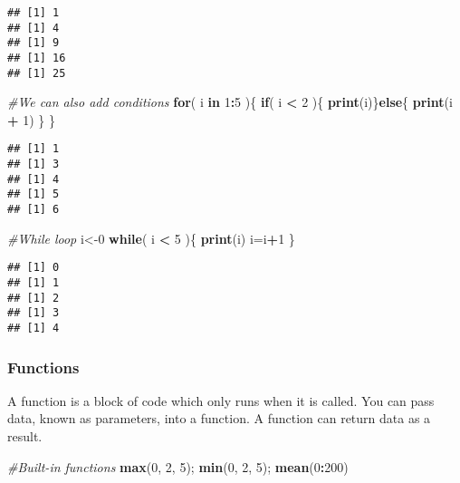 \documentclass[
]{article}
\newenvironment{Shaded}{\begin{snugshade}}{\end{snugshade}}
\newcommand{\CommentTok}[1]{\textcolor[rgb]{0.56,0.35,0.01}{\textit{#1}}}
\newcommand{\ControlFlowTok}[1]{\textcolor[rgb]{0.13,0.29,0.53}{\textbf{#1}}}
\newcommand{\DecValTok}[1]{\textcolor[rgb]{0.00,0.00,0.81}{#1}}
\newcommand{\FunctionTok}[1]{\textcolor[rgb]{0.13,0.29,0.53}{\textbf{#1}}}
\newcommand{\NormalTok}[1]{#1}
\newcommand{\OtherTok}[1]{\textcolor[rgb]{0.56,0.35,0.01}{#1}}
\newcommand{\SpecialCharTok}[1]{\textcolor[rgb]{0.81,0.36,0.00}{\textbf{#1}}}
\begin{document}
\begin{verbatim}
## [1] 1
## [1] 4
## [1] 9
## [1] 16
## [1] 25
\end{verbatim}

\begin{Shaded}
\begin{Highlighting}[]
\CommentTok{\#We can also add conditions}
\ControlFlowTok{for}\NormalTok{( i }\ControlFlowTok{in} \DecValTok{1}\SpecialCharTok{:}\DecValTok{5}\NormalTok{ )\{}
  \ControlFlowTok{if}\NormalTok{( i }\SpecialCharTok{\textless{}} \DecValTok{2}\NormalTok{ )\{}
    \FunctionTok{print}\NormalTok{(i)\}}\ControlFlowTok{else}\NormalTok{\{}
      \FunctionTok{print}\NormalTok{(i }\SpecialCharTok{+} \DecValTok{1}\NormalTok{)}
\NormalTok{    \}}
\NormalTok{\}}
\end{Highlighting}
\end{Shaded}

\begin{verbatim}
## [1] 1
## [1] 3
## [1] 4
## [1] 5
## [1] 6
\end{verbatim}

\begin{Shaded}
\begin{Highlighting}[]
\CommentTok{\#While loop}
\NormalTok{i}\OtherTok{\textless{}{-}}\DecValTok{0}
\ControlFlowTok{while}\NormalTok{( i }\SpecialCharTok{\textless{}} \DecValTok{5}\NormalTok{ )\{}
  \FunctionTok{print}\NormalTok{(i)}
\NormalTok{  i}\OtherTok{=}\NormalTok{i}\SpecialCharTok{+}\DecValTok{1}
\NormalTok{\}}
\end{Highlighting}
\end{Shaded}

\begin{verbatim}
## [1] 0
## [1] 1
## [1] 2
## [1] 3
## [1] 4
\end{verbatim}

\hypertarget{functions}{%
\subsubsection{Functions}\label{functions}}

A function is a block of code which only runs when it is called. You can
pass data, known as parameters, into a function. A function can return
data as a result.

\begin{Shaded}
\begin{Highlighting}[]
\CommentTok{\#Built{-}in functions}
\FunctionTok{max}\NormalTok{(}\DecValTok{0}\NormalTok{, }\DecValTok{2}\NormalTok{, }\DecValTok{5}\NormalTok{); }\FunctionTok{min}\NormalTok{(}\DecValTok{0}\NormalTok{, }\DecValTok{2}\NormalTok{, }\DecValTok{5}\NormalTok{); }\FunctionTok{mean}\NormalTok{(}\DecValTok{0}\SpecialCharTok{:}\DecValTok{200}\NormalTok{)}
\end{Highlighting}
\end{Shaded}
\end{document}
